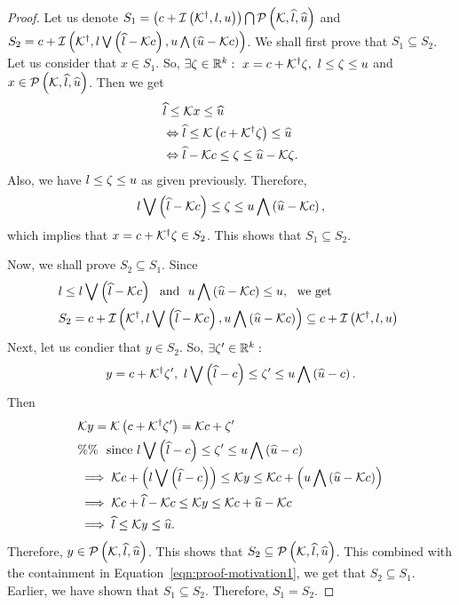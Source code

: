 \begin{proof}
Let us denote
$S_1=\left(c+\mathit{\operatorname{\mathcal{I}}}\left({\mathcal{K}}^\dagger,l,u\right)\right)\bigcap\mathcal{P}\left(\mathcal{K},\widehat{l},\widehat{u}\right)$
and\\
$S_2=c+\mathit{\operatorname{\mathcal{I}}}\left({\mathcal{K}}^\dagger,l\bigvee \left(\widehat{l}-\mathcal{K}c\right),u\bigwedge \left(\widehat{u}-\mathcal{K}c\right)\right)$.
We shall first prove that $S_1\subseteq S_2$.  Let us consider that
$x\in S_1$.  So, $\exists
\zeta\in\mathbb{R}^k:~x=c+{\mathcal{K}}^\dagger\zeta,~l\leq\zeta\leq u$
and $x\in\mathcal{P}\left(\mathcal{K},\widehat{l},\widehat{u}\right)$. Then we get
%
\begin{align*}
& \widehat{l}\leq\mathcal{K} x\leq \widehat{u}\\
& \Leftrightarrow \widehat{l}\leq \mathcal{K}\left(c+{\mathcal{K}}^\dagger\zeta\right)\leq \widehat{u}\\
& \Leftrightarrow \widehat{l}-\mathcal{K}c\leq\zeta\leq\widehat{u}-\mathcal{K}\zeta.
\end{align*}
%
Also, we have $l\leq \zeta\leq u$ as given previously.
Therefore,
\[l\bigvee \left(\widehat{l}-\mathcal{K}c\right)\leq\zeta\leq u\bigwedge \left(\widehat{u}-\mathcal{K}c\right),\]
which implies that $x=c+{\mathcal{K}}^\dagger\zeta\in S_2$.  This shows that $S_1\subseteq S_2$.

Now, we shall prove $S_2\subseteq S_1$.  Since
\begin{align}
&l\leq l\bigvee \left(\widehat{l}-\mathcal{K}c\right)~~\text{and}~~u\bigwedge \left(\widehat{u}-\mathcal{K}c\right)\leq
u,~~\text{we get}\nonumber\\
&
S_2=c+\mathit{\operatorname{\mathcal{I}}}\left({\mathcal{K}}^\dagger,l\bigvee \left(\widehat{l}-\mathcal{K}c\right),u\bigwedge \left(\widehat{u}-\mathcal{K}c\right)\right)
\subseteq c+\mathit{\operatorname{\mathcal{I}}}\left({\mathcal{K}}^\dagger,l,u\right)~\label{eqn:proof-motivation1}
\end{align}
%
Next, let us condier that $y\in S_2$.  So, $\exists
\zeta^\prime\in\mathbb{R}^k:$ \[y=c+{\mathcal{K}}^\dagger\zeta^\prime,~l\bigvee \left(\widehat{l}-c\right)\leq\zeta^\prime
\leq u\bigwedge \left(\widehat{u}-c\right).\]
Then
%
\begin{align*}
& \mathcal{K} y=\mathcal{K}\left(c+{\mathcal{K}}^\dagger\zeta^\prime\right)=\mathcal{K}c+\zeta^\prime\\
& \%\%~~\text{since}~l\bigvee \left(\widehat{l}-c\right)\leq\zeta^\prime\leq
u\bigwedge \left(\widehat{u}-c\right)\\
& \implies \mathcal{K}c+\left(l\bigvee \left(\widehat{l}-c\right)\right)\leq \mathcal{K}
y\leq \mathcal{K}c+\left(u\bigwedge \left(\widehat{u}-\mathcal{K}c\right)\right)\\
& \implies \mathcal{K}c+\widehat{l}-\mathcal{K}c\leq\mathcal{K} y\leq
\mathcal{K}c+\widehat{u}-\mathcal{K}c\\
& \implies \widehat{l}\leq\mathcal{K} y\leq\widehat{u}.
\end{align*}
%
Therefore, $y\in\mathcal{P}\left(\mathcal{K},\widehat{l},\widehat{u}\right)$.  This shows that
$S_2\subseteq \mathcal{P}\left(\mathcal{K},\widehat{l},\widehat{u}\right)$.  This combined with the
containment in Equation~\ref{eqn:proof-motivation1}, we get that
$S_2\subseteq S_1$.  Earlier, we have shown that $S_1\subseteq S_2$.
Therefore, $S_1=S_2$.
\end{proof}

